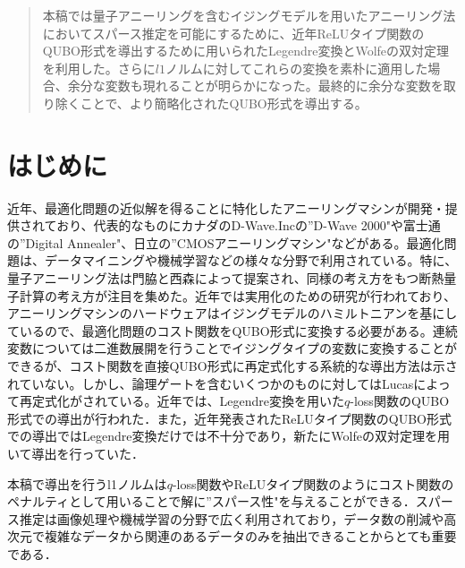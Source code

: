 \documentclass[paper]{ieicej}
\begin{document}
\begin{abstract}
  本稿では量子アニーリングを含むイジングモデルを用いたアニーリング法においてスパース推定を可能にするために、近年ReLUタイプ関数のQUBO形式を導出するために用いられたLegendre変換とWolfeの双対定理を利用した。さらに$l1$ノルムに対してこれらの変換を素朴に適用した場合、余分な変数も現れることが明らかになった。最終的に余分な変数を取り除くことで、より簡略化されたQUBO形式を導出する。
\end{abstract}
\begin{keyword}
\end{keyword}
\begin{eabstract}
\end{eabstract}
\begin{ekeyword}
\end{ekeyword}
\maketitle

\section{はじめに} 
近年、最適化問題の近似解を得ることに特化したアニーリングマシンが開発・提供されており、代表的なものにカナダのD-Wave.Incの''D-Wave 2000"や富士通の''Digital Annealer"、日立の''CMOSアニーリングマシン"などがある。最適化問題は、データマイニングや機械学習などの様々な分野で利用されている。特に、量子アニーリング法は門脇と西森によって提案され、同様の考え方をもつ断熱量子計算の考え方が注目を集めた。近年では実用化のための研究が行われており、
アニーリングマシンのハードウェアはイジングモデルのハミルトニアンを基にしているので、最適化問題のコスト関数をQUBO形式に変換する必要がある。連続変数については二進数展開を行うことでイジングタイプの変数に変換することができるが、コスト関数を直接QUBO形式に再定式化する系統的な導出方法は示されていない。しかし、論理ゲートを含むいくつかのものに対してはLucasによって再定式化がされている。近年では、Legendre変換を用いた$q$-loss関数のQUBO形式での導出が行われた．また，近年発表されたReLUタイプ関数のQUBO形式での導出ではLegendre変換だけでは不十分であり，新たにWolfeの双対定理を用いて導出を行っていた．

本稿で導出を行うl1ノルムは$q$-loss関数やReLUタイプ関数のようにコスト関数のペナルティとして用いることで解に''スパース性"を与えることができる．スパース推定は画像処理や機械学習の分野で広く利用されており，データ数の削減や高次元で複雑なデータから関連のあるデータのみを抽出できることからとても重要である．
\end{document}
